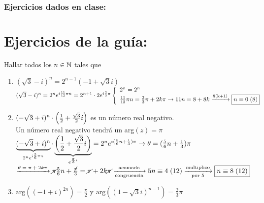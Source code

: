 \documentclass[12pt,a4paper, spanish]{article}
\begin{document}
\subsubsection*{Ejercicios dados en clase:}
\ejercicio

\ejercicio

\newpage


\section*{Ejercicios de la guía:}
\setcounter{ejercicio}{0} %

\ejercicio

\setcounter{ejercicio}{6}

\ejercicio
Hallar todos los $n \in \mathbb N$ tales que
\begin{enumerate}[label=\roman*)]
	\item $(\sqrt3 -i)^n = 2^{n-1}(-1 + \sqrt3 i)$ \\
	      \separadorCorto
	      $(\sqrt3 -i)^n = 2^n e^{i\frac{11}{12}\pi n} = 2^{n+1}\cdot 2e^{i \frac{2}{3} \pi}
		      \llave{l}{
			      2^n = 2^n\\
			      \frac{11}{12}\pi n = \frac{2}{3}\pi + 2k \pi \to 11n = 8+8k \flecha{8(k+1)} \boxed{\congruencia{n}{0}{8}}
		      }$

	\item $(-\sqrt3 + i)^n \cdot \left( \frac{1}{2} + \frac{\sqrt3}{2}i \right)$ es un número real negativo.\\
	      \separadorCorto
	      Un número real negativo tendrá un arg$(z) = \pi$\\
	      $\underbrace{(-\sqrt3 + i)^n}_{2^ne^{i\frac{5}{6}\pi n}} \cdot \underbrace{\left( \frac{1}{2} + \frac{\sqrt3}{2}i \right)}_{e^{\frac{\pi}{3}i}} =
		      2^ne^{i(\frac{5}{6}n + \frac{1}{3}) \pi} \to \theta = (\frac{5}{6}n + \frac{1}{3}) \pi $\\
	      $\flecha{$\theta = \pi + 2k\pi$}
		      \cancel\pi \frac{5}{6}n + \frac{\cancel\pi}{3} = \cancel\pi + 2k\cancel\pi
		      \flecha{acomodo}[congruencia]
		      \congruencia{5n}{4}{12}
		      \flecha{multiplico}[por 5]
		      \boxed{\congruencia{n}{8}{12}} $

	\item $\text{arg}((-1+i)^{2n}) = \frac{\pi}{2}$ y $\text{arg}((1-\sqrt3 i)^{n-1}) = \frac{2}{3}\pi$
	      \separadorCorto


\end{enumerate}
\end{document}
